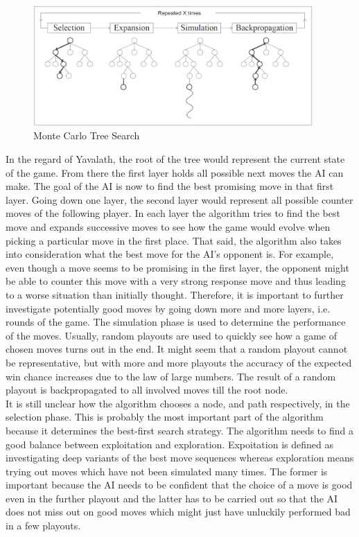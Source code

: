 \documentclass[english]{report}
\begin{document}
\begin{figure}[ht]
\centering
\includegraphics[width=0.95\textwidth]{Abbildungen/MonteCarloTreeSearch.png}
\caption[Monte Carlo Tree Search, Source:\cite{paper:mcts}]{Monte Carlo Tree Search}
\label{fig:yav_winChance}
\end{figure}

In the regard of Yavalath, the root of the tree would represent the current
state of the game. From there the first layer holds all possible next moves the
AI can make. The goal of the AI is now to find the best promising move in that
first layer. Going down one layer, the second layer would represent all possible
counter moves of the following player. In each layer the algorithm tries to find
the best move and expands successive moves to see how the game would evolve when
picking a particular move in the first place. That said, the algorithm also
takes into consideration what the best move for the AI's opponent is. For example,
even though a move seems to be promising in the first layer, the opponent might
be able to counter this move with a very strong response move and thus leading
to a worse situation than initially thought. Therefore, it is important to
further investigate potentially good moves by going down more and more layers,
i.e. rounds of the game. The simulation phase is used to determine the
performance of the moves. Usually, random playouts are used to quickly see how a
game of chosen moves turns out in the end. It might seem that a random playout
cannot be representative, but with more and more playouts the accuracy of the
expected win chance increases due to the law of large numbers.
The result of a random playout is backpropagated to all involved moves till the
root node.\\

It is still unclear how the algorithm chooses a node, and path
respectively, in the selection phase. This is probably the most important part
of the algorithm because it determines the best-first search strategy. The
algorithm needs to find a good balance between exploitation and exploration.
Expoitation is defined as investigating deep variants of the best move sequences
whereas exploration means trying out moves which have not been simulated many
times. The former is important because the AI needs to be confident that the
choice of a move is good even in the further playout and the latter has to be
carried out so that the AI does not miss out on good moves which might just have
unluckily performed bad in a few playouts.\\
\end{document}

